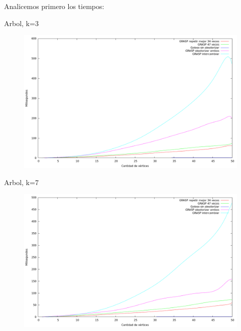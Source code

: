 Analicemos primero los tiempos:

Arbol, k=3
\vspace*{0.5cm}

\begin{figure}[H]
  \begin{center}
    \includegraphics[scale=0.35]{imagenes/ej6-arbol-k3-tiempo.png}
  \end{center}
\end{figure}

\vspace*{0.5cm}

Arbol, k=7
\vspace*{0.5cm}

\begin{figure}[H]
  \begin{center}
    \includegraphics[scale=0.35]{imagenes/ej6-arbol-k7-tiempo.png}
  \end{center}
\end{figure}


